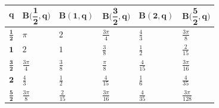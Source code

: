 {\def\LTcaptype{none} %
\begin{longtable}[]{@{}
  >{\centering\arraybackslash}p{}
  >{\centering\arraybackslash}p{}
  >{\centering\arraybackslash}p{}
  >{\centering\arraybackslash}p{}
  >{\centering\arraybackslash}p{}
  >{\centering\arraybackslash}p{}@{}}
\toprule\noalign{}
\begin{minipage}[b]{\linewidth}\centering
\[\mathbf{q}\]
\end{minipage} & \begin{minipage}[b]{\linewidth}\centering
\[\mathbf{B(}\frac{\mathbf{1}}{\mathbf{2}}\mathbf{,q)}\]
\end{minipage} & \begin{minipage}[b]{\linewidth}\centering
\[\mathbf{B(1,q)}\]
\end{minipage} & \begin{minipage}[b]{\linewidth}\centering
\[\mathbf{B(}\frac{\mathbf{3}}{\mathbf{2}}\mathbf{,q)}\]
\end{minipage} & \begin{minipage}[b]{\linewidth}\centering
\[\mathbf{B(2,q)}\]
\end{minipage} & \begin{minipage}[b]{\linewidth}\centering
\[\mathbf{B(}\frac{\mathbf{5}}{\mathbf{2}}\mathbf{,q)}\]
\end{minipage} \\
\midrule\noalign{}
\endhead
\bottomrule\noalign{}
\endlastfoot
\(\frac{\mathbf{1}}{\mathbf{2}}\) & \(\pi\) & \(2\) & \(\frac{3\pi}{4}\)
& \(\frac{4}{3}\) & \(\frac{3\pi}{8}\) \\
\(\mathbf{1}\) & \(2\) & \(1\) & \(\frac{3}{8}\) & \(\frac{1}{2}\) &
\(\frac{2}{15}\) \\
\(\frac{\mathbf{3}}{\mathbf{2}}\) & \(\frac{3\pi}{4}\) & \(\frac{3}{8}\)
& \(\frac{\pi}{8}\) & \(\frac{4}{15}\) & \(\frac{3\pi}{16}\) \\
\(\mathbf{2}\) & \(\frac{4}{3}\) & \(\frac{1}{2}\) & \(\frac{4}{15}\) &
\(\frac{1}{6}\) & \(\frac{4}{35}\) \\
\(\frac{\mathbf{5}}{\mathbf{2}}\) & \(\frac{3\pi}{8}\) &
\(\frac{2}{15}\) & \(\frac{3\pi}{16}\) & \(\frac{4}{35}\) &
\(\frac{3\pi}{128}\) \\
\end{longtable}
}

